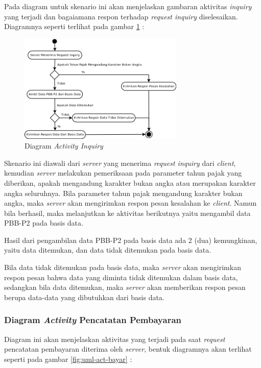 \documentclass[pdftex,12pt, oneside]{article}
\begin{document}
Pada diagram untuk skenario ini akan menjelaskan gambaran aktivitas \textit{inquiry} yang terjadi dan bagaiamana respon terhadap \textit{request inquiry} diselesaikan. Diagramnya seperti terlihat pada gambar \ref{fig:uml-act-inq} :

\begin{figure}[H]
  \centering
  \includegraphics[width=0.7\textwidth]{./resources/diagram/uml-act-inquiry}
  \caption{Diagram \textit{Activity Inquiry}}
  \label{fig:uml-act-inq}
\end{figure}

Skenario ini diawali dari \textit{server} yang menerima \textit{request inquiry} dari \textit{client}, kemudian \textit{server} melakukan pemeriksaan pada parameter tahun pajak yang diberikan, apakah mengandung karakter bukan angka atau merupakan karakter angka seluruhnya. Bila parameter tahun pajak mengandung karakter bukan angka, maka \textit{server} akan mengirimkan respon pesan kesalahan ke \textit{client}. Namun bila berhasil, maka melanjutkan ke aktivitas berikutnya yaitu mengambil data PBB-P2 pada basis data.

Hasil dari pengambilan data PBB-P2 pada basis data ada 2 (dua) kemungkinan, yaitu data ditemukan, dan data tidak ditemukan pada basis data.

Bila data tidak ditemukan pada basis data, maka \textit{server} akan mengirimkan respon pesan bahwa data yang diminta tidak ditemukan dalam basis data, sedangkan bila data ditemukan, maka \textit{server} akan memberikan respon pesan berupa data-data yang dibutuhkan dari basis data.

\subsubsection{Diagram \textit{Activity} Pencatatan Pembayaran}

Diagram ini akan menjelaskan aktivitas yang terjadi pada saat \textit{request} pencatatan pembayaran diterima oleh \textit{server}, bentuk diagramnya akan terlihat seperti pada gambar \ref{fig:uml-act-bayar} :
\end{document}
